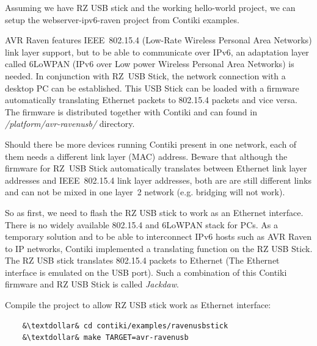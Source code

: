 \documentclass{article}
\begin{document}
Assuming we have RZ USB stick and the working hello-world project,
we can setup the webserver-ipv6-raven project from Contiki examples.

AVR Raven features IEEE~802.15.4 (Low-Rate Wireless Personal Area Networks) link layer support,
but to be able to communicate over IPv6, an adaptation layer called
6LoWPAN (IPv6 over Low power Wireless Personal Area Networks) is needed.
In conjunction with RZ~USB Stick, the network connection with a desktop PC can be established.
This USB Stick can be loaded with a firmware automatically translating
Ethernet packets to 802.15.4 packets and vice versa.
The firmware is distributed together with Contiki and
can found in {\it{/platform/avr-ravenusb/}} directory.

Should there be more devices running Contiki present in one network,
each of them needs a different link layer (MAC) address.
Beware that although the firmware for RZ~USB Stick automatically translates
between Ethernet link layer addresses and IEEE~802.15.4 link layer
addresses, both are are still different links and can not be mixed in one
layer~2 network (e.g. bridging will not work).

So as first, we need to flash the RZ USB stick to work as an Ethernet interface.
There is no widely available 802.15.4 and 6LoWPAN stack for PCs.
As a temporary solution and to be able to interconnect IPv6 hosts such as AVR Raven to IP networks,
Contiki implemented a translating function on the RZ USB Stick.
The RZ USB stick translates 802.15.4 packets to Ethernet (The Ethernet interface is emulated on the USB port).
Such a combination of this Contiki firmware and RZ USB Stick is called {\it{Jackdaw}}.

Compile the project to allow RZ USB stick work as Ethernet interface:
\begin{lstlisting}
	&\textdollar& cd contiki/examples/ravenusbstick
	&\textdollar& make TARGET=avr-ravenusb
\end{lstlisting}
\end{document}
